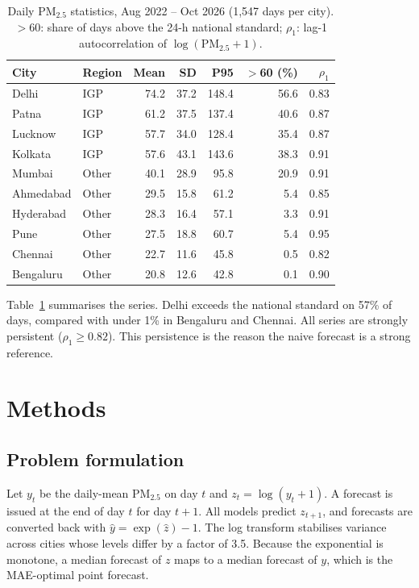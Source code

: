 \documentclass[conference]{IEEEtran}
\begin{document}
\begin{table}[t]
\centering
\caption{Daily PM$_{2.5}$ statistics, Aug 2022 -- Oct 2026 (1{,}547 days per city). $>$60: share of days above the 24-h national standard; $\rho_1$: lag-1 autocorrelation of $\log(\mathrm{PM}_{2.5}+1)$.}
\label{tab:data}
\setlength{\tabcolsep}{4pt}
\begin{tabular}{llrrrrr}
\toprule
City & Region & Mean & SD & P95 & $>$60 (\%) & $\rho_1$ \\
\midrule
Delhi     & IGP   & 74.2 & 37.2 & 148.4 & 56.6 & 0.83 \\
Patna     & IGP   & 61.2 & 37.5 & 137.4 & 40.6 & 0.87 \\
Lucknow   & IGP   & 57.7 & 34.0 & 128.4 & 35.4 & 0.87 \\
Kolkata   & IGP   & 57.6 & 43.1 & 143.6 & 38.3 & 0.91 \\
Mumbai    & Other & 40.1 & 28.9 &  95.8 & 20.9 & 0.91 \\
Ahmedabad & Other & 29.5 & 15.8 &  61.2 &  5.4 & 0.85 \\
Hyderabad & Other & 28.3 & 16.4 &  57.1 &  3.3 & 0.91 \\
Pune      & Other & 27.5 & 18.8 &  60.7 &  5.4 & 0.95 \\
Chennai   & Other & 22.7 & 11.6 &  45.8 &  0.5 & 0.82 \\
Bengaluru & Other & 20.8 & 12.6 &  42.8 &  0.1 & 0.90 \\
\bottomrule
\end{tabular}
\end{table}

Table~\ref{tab:data} summarises the series. Delhi exceeds the national standard on
57\% of days, compared with under 1\% in Bengaluru and Chennai. All series are strongly
persistent ($\rho_1\ge0.82$). This persistence is the reason the naive forecast is a
strong reference.

\section{Methods}\label{sec:method}
\subsection{Problem formulation}
Let $y_t$ be the daily-mean PM$_{2.5}$ on day $t$ and $z_t=\log(y_t+1)$. A forecast is
issued at the end of day $t$ for day $t+1$. All models predict $z_{t+1}$, and forecasts are
converted back with $\hat y=\exp(\hat z)-1$. The log transform stabilises variance
across cities whose levels differ by a factor of 3.5. Because the exponential is monotone,
a median forecast of $z$ maps to a median forecast of $y$, which is the
MAE-optimal point forecast.
\end{document}
